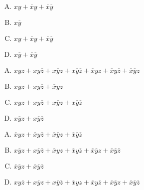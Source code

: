{{        %
        \begin{practices}
            \begin{enumerate}[A.]
                \item $xy + \overline{x}y + \overline{x}\overline{y}$
                \item $x\overline{y}$
                \item $xy + \overline{x}y + \overline{x}\overline{y}$
                \item $x\overline{y} + \overline{x}\overline{y}$
            \end{enumerate}
        \end{practices}

        \begin{practices}
            \begin{enumerate}[A.]
                \item $xyz + xy\overline{z} + x\overline{y}z + x\overline{y}\overline{z} + \overline{x}yz + \overline{x}y\overline{z} + \overline{x}\overline{y}z$
                \item $xyz + xy\overline{z} + \overline{x}yz$
                \item $xyz + xy\overline{z} + x\overline{y}z + x\overline{y}\overline{z}$
                \item $x\overline{y}z + x\overline{y}\overline{z}$
            \end{enumerate}
        \end{practices}

        \begin{practices}
            \begin{enumerate}[A.]
                \item $\overline{x}yz + \overline{x}y\overline{z} + \overline{x}\overline{y}z + \overline{x}\overline{y}\overline{z}$
                \item $x\overline{y}z + x\overline{y}\overline{z} + \overline{x}yz + \overline{x}y\overline{z} + \overline{x}\overline{y}z + \overline{x}\overline{y}\overline{z}$
                \item $\overline{x}\overline{y}z + \overline{x}\overline{y}\overline{z}$
                \item $xy\overline{z} + x\overline{y}z + x\overline{y}\overline{z} + \overline{x}yz + \overline{x}y\overline{z} + \overline{x}\overline{y}z + \overline{x}\overline{y}\overline{z}$
            \end{enumerate}
        \end{practices}

}}
